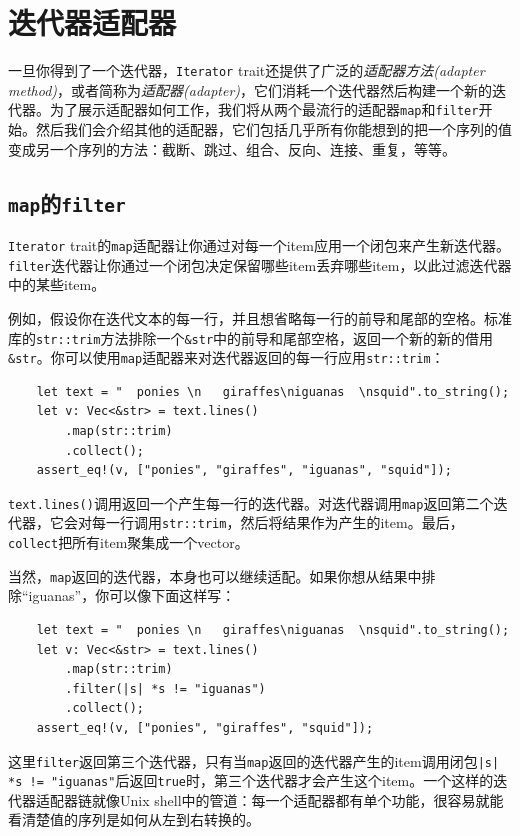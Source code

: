 \section{迭代器适配器}

一旦你得到了一个迭代器，\texttt{Iterator} trait还提供了广泛的\emph{适配器方法(adapter method)}，或者简称为\emph{适配器(adapter)}，它们消耗一个迭代器然后构建一个新的迭代器。为了展示适配器如何工作，我们将从两个最流行的适配器\texttt{map}和\texttt{filter}开始。然后我们会介绍其他的适配器，它们包括几乎所有你能想到的把一个序列的值变成另一个序列的方法：截断、跳过、组合、反向、连接、重复，等等。

\subsection{\texttt{map}的\texttt{filter}}
\texttt{Iterator} trait的\texttt{map}适配器让你通过对每一个item应用一个闭包来产生新迭代器。\texttt{filter}迭代器让你通过一个闭包决定保留哪些item丢弃哪些item，以此过滤迭代器中的某些item。

例如，假设你在迭代文本的每一行，并且想省略每一行的前导和尾部的空格。标准库的\texttt{str::trim}方法排除一个\texttt{\&str}中的前导和尾部空格，返回一个新的新的借用\texttt{\&str}。你可以使用\texttt{map}适配器来对迭代器返回的每一行应用\texttt{str::trim}：
\begin{verbatim}
    let text = "  ponies \n   giraffes\niguanas  \nsquid".to_string();
    let v: Vec<&str> = text.lines()
        .map(str::trim)
        .collect();
    assert_eq!(v, ["ponies", "giraffes", "iguanas", "squid"]);
\end{verbatim}

\texttt{text.lines()}调用返回一个产生每一行的迭代器。对迭代器调用\texttt{map}返回第二个迭代器，它会对每一行调用\texttt{str::trim}，然后将结果作为产生的item。最后，\texttt{collect}把所有item聚集成一个vector。

当然，\texttt{map}返回的迭代器，本身也可以继续适配。如果你想从结果中排除“iguanas”，你可以像下面这样写：
\begin{verbatim}
    let text = "  ponies \n   giraffes\niguanas  \nsquid".to_string();
    let v: Vec<&str> = text.lines()
        .map(str::trim)
        .filter(|s| *s != "iguanas")
        .collect();
    assert_eq!(v, ["ponies", "giraffes", "squid"]);
\end{verbatim}

这里\texttt{filter}返回第三个迭代器，只有当\texttt{map}返回的迭代器产生的item调用闭包\texttt{|s| *s != "iguanas"}后返回\texttt{true}时，第三个迭代器才会产生这个item。一个这样的迭代器适配器链就像Unix shell中的管道：每一个适配器都有单个功能，很容易就能看清楚值的序列是如何从左到右转换的。

